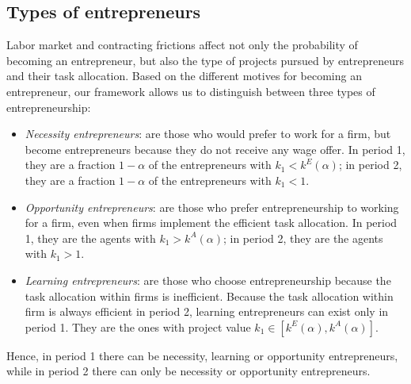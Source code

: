 \documentclass[12pt,american]{paper}
\theoremstyle{remark}
\begin{document}




\subsection{Types of entrepreneurs}

Labor market and contracting frictions affect not only the probability of becoming an entrepreneur, but also the type of projects pursued by entrepreneurs and their task allocation. Based on the different motives for becoming an entrepreneur, our framework allows us to distinguish between three types of entrepreneurship: 
\begin{itemize}
\item \textit{Necessity entrepreneurs}: are those who would prefer to work for a firm, but become entrepreneurs because they do not receive any wage offer. In period 1, they are a fraction $1-\alpha$ of the entrepreneurs with $k_1 < k^E(\alpha)$; in period 2, they are a fraction $1-\alpha$ of the entrepreneurs with $k_1 < 1$.
 \item \textit{Opportunity entrepreneurs}: are those who prefer entrepreneurship to working for a firm, even when firms implement the efficient task allocation. In period 1, they are the agents with $k_1>k^A(\alpha)$; in period 2, they are the agents with $k_1>1$.
   \item \textit{Learning entrepreneurs}: are those who choose entrepreneurship because the task allocation within firms is inefficient. Because the task allocation within firm is always efficient in period 2, learning entrepreneurs can exist only in period 1. They are the ones with project value $k_1\in[k^E(\alpha),k^A(\alpha)]$.
  
\end{itemize}
Hence, in period 1 there can be necessity, learning or opportunity entrepreneurs, while in period 2 there can only be necessity or opportunity entrepreneurs.
\end{document}

